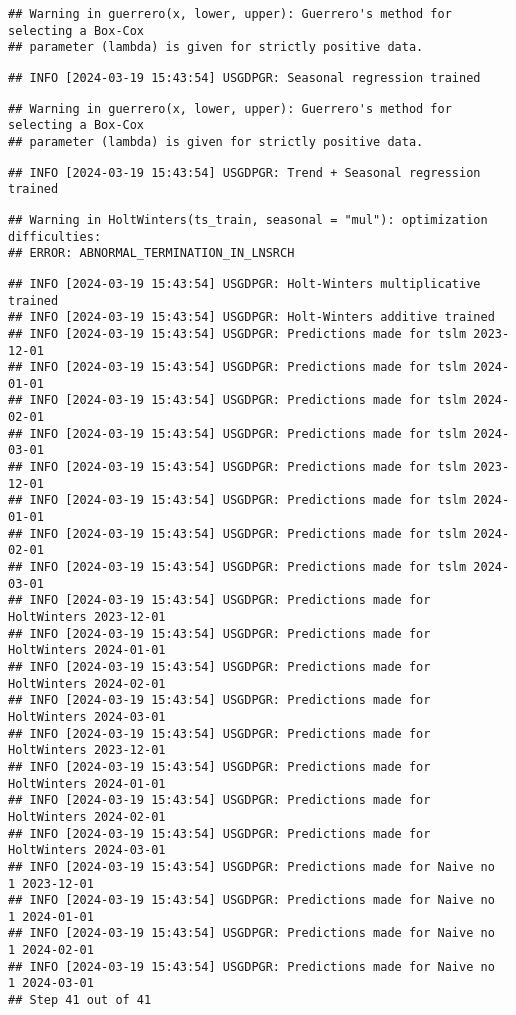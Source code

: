 \documentclass[
]{article}
\begin{document}
\begin{verbatim}
## Warning in guerrero(x, lower, upper): Guerrero's method for selecting a Box-Cox
## parameter (lambda) is given for strictly positive data.
\end{verbatim}

\begin{verbatim}
## INFO [2024-03-19 15:43:54] USGDPGR: Seasonal regression trained
\end{verbatim}

\begin{verbatim}
## Warning in guerrero(x, lower, upper): Guerrero's method for selecting a Box-Cox
## parameter (lambda) is given for strictly positive data.
\end{verbatim}

\begin{verbatim}
## INFO [2024-03-19 15:43:54] USGDPGR: Trend + Seasonal regression trained
\end{verbatim}

\begin{verbatim}
## Warning in HoltWinters(ts_train, seasonal = "mul"): optimization difficulties:
## ERROR: ABNORMAL_TERMINATION_IN_LNSRCH
\end{verbatim}

\begin{verbatim}
## INFO [2024-03-19 15:43:54] USGDPGR: Holt-Winters multiplicative trained
## INFO [2024-03-19 15:43:54] USGDPGR: Holt-Winters additive trained
## INFO [2024-03-19 15:43:54] USGDPGR: Predictions made for tslm 2023-12-01
## INFO [2024-03-19 15:43:54] USGDPGR: Predictions made for tslm 2024-01-01
## INFO [2024-03-19 15:43:54] USGDPGR: Predictions made for tslm 2024-02-01
## INFO [2024-03-19 15:43:54] USGDPGR: Predictions made for tslm 2024-03-01
## INFO [2024-03-19 15:43:54] USGDPGR: Predictions made for tslm 2023-12-01
## INFO [2024-03-19 15:43:54] USGDPGR: Predictions made for tslm 2024-01-01
## INFO [2024-03-19 15:43:54] USGDPGR: Predictions made for tslm 2024-02-01
## INFO [2024-03-19 15:43:54] USGDPGR: Predictions made for tslm 2024-03-01
## INFO [2024-03-19 15:43:54] USGDPGR: Predictions made for HoltWinters 2023-12-01
## INFO [2024-03-19 15:43:54] USGDPGR: Predictions made for HoltWinters 2024-01-01
## INFO [2024-03-19 15:43:54] USGDPGR: Predictions made for HoltWinters 2024-02-01
## INFO [2024-03-19 15:43:54] USGDPGR: Predictions made for HoltWinters 2024-03-01
## INFO [2024-03-19 15:43:54] USGDPGR: Predictions made for HoltWinters 2023-12-01
## INFO [2024-03-19 15:43:54] USGDPGR: Predictions made for HoltWinters 2024-01-01
## INFO [2024-03-19 15:43:54] USGDPGR: Predictions made for HoltWinters 2024-02-01
## INFO [2024-03-19 15:43:54] USGDPGR: Predictions made for HoltWinters 2024-03-01
## INFO [2024-03-19 15:43:54] USGDPGR: Predictions made for Naive no  1 2023-12-01
## INFO [2024-03-19 15:43:54] USGDPGR: Predictions made for Naive no  1 2024-01-01
## INFO [2024-03-19 15:43:54] USGDPGR: Predictions made for Naive no  1 2024-02-01
## INFO [2024-03-19 15:43:54] USGDPGR: Predictions made for Naive no  1 2024-03-01
## Step 41 out of 41
\end{verbatim}
\end{document}

